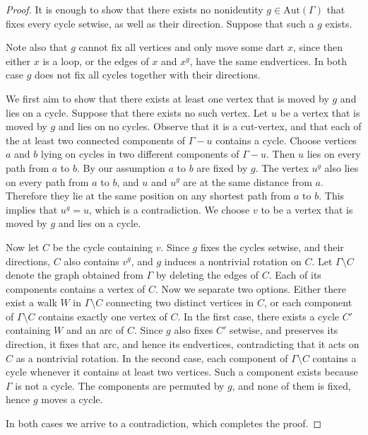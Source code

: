 \documentclass[10pt,a4paper]{amsart}
\newcommand{\Aut}{\mathrm{Aut}}
\begin{document}
\begin{proof}
  It is enough to show that there
  exists no nonidentity $g\in\Aut(\Gamma)$ that fixes every cycle
  setwise, as well as their direction. Suppose that such a $g$ exists.
  
  Note also that $g$ cannot fix all vertices and only move some dart $x$, since then either $x$ is a loop, or the edges of $x$ and $x^g$, have the same
  endvertices. In both case $g$ does not fix all cycles together with their directions.

  We first aim to show that there exists at least one vertex that is moved by $g$ and lies on a
  cycle. Suppose that there exists no such vertex. Let $u$ be a vertex that is moved by $g$ and lies on
  no cycles. Observe that it is a cut-vertex, and that each of the at least two connected
  components of $\Gamma - u$ contains a cycle. Choose vertices $a$ and $b$ lying on cycles in two different components
  of $\Gamma-u$. Then $u$ lies on every path from $a$ to $b$. By our assumption $a$ to $b$ are fixed by $g$.
The vertex $u^g$ also lies on every path from $a$ to $b$, and $u$ and $u^g$ are at the same distance from $a$.
Therefore they
  lie at the same position on any shortest path from $a$ to $b$. This implies that $u^g=u$, which is a contradiction.
  We choose $v$ to be
  a vertex that is moved by $g$ and lies on a cycle.

  Now let $C$ be the cycle containing $v$. Since $g$ fixes the cycles
  setwise, and their directions, $C$ also contains $v^g$, and $g$ induces
  a nontrivial rotation on $C$. Let $\Gamma \setminus C$ denote the graph obtained from $\Gamma$ by
  deleting the edges of $C$. Each of its components contains a vertex of $C$.
  Now we separate two options. Either there exist a walk $W$
  in $\Gamma \setminus C$ connecting two distinct vertices in $C$, or each component of
  $\Gamma \setminus C$ contains exactly one vertex of $C$. In the first case, there exists a cycle $C'$ containing $W$
  and an arc of $C$. Since $g$ also fixes $C'$ setwise, and preserves its direction,
  it fixes that arc, and hence its endvertices, contradicting that it acts on $C$ as a nontrivial rotation.
  In the second case, each component of
  $\Gamma \setminus C$
  contains a cycle whenever it contains at least two vertices. Such a component exists because
  $\Gamma$ is not a cycle. The
  components are permuted by $g$, and none of them is fixed, hence $g$ moves a cycle.

  In both cases we arrive to a contradiction, which completes the proof.
\end{proof}
\end{document}
